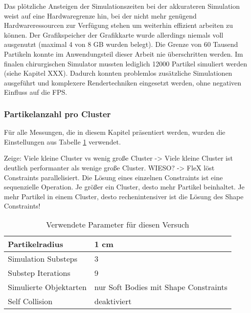 
Das plötzliche Ansteigen der Simulationszeiten bei der akkurateren Simulation weist auf eine Hardwaregrenze hin, bei der nicht mehr genügend Hardwareressourcen zur Verfügung stehen um weiterhin effizient arbeiten zu können. Der Grafikspeicher der Grafikkarte wurde allerdings niemals voll ausgenutzt (maximal 4 von 8 GB wurden belegt). Die Grenze von 60 Tausend Partikeln konnte im Anwendungsteil dieser Arbeit nie überschritten werden. Im finalen chirurgischen Simulator mussten lediglich 12000 Partikel simuliert werden (siehe Kapitel XXX). Dadurch konnten problemlos zusätzliche Simulationen ausgeführt und komplexere Rendertechniken eingesetzt werden, ohne negativen Einfluss auf die FPS.





\subsubsection{Partikelanzahl pro Cluster}
Für alle Messungen, die in diesem Kapitel präsentiert werden, wurden die Einstellungen aus Tabelle \ref{table_soft_assets} verwendet.


Zeige: Viele kleine Cluster vs wenig große Cluster -> Viele kleine Cluster ist deutlich performanter als wenige große Cluster. WIESO? -> FleX löst Constraints parallelisiert. Die Lösung eines einzelnen Constraints ist eine sequenzielle Operation. Je größer ein Cluster, desto mehr Partikel beinhaltet. Je mehr Partikel in einem Cluster, desto rechenintensiver ist die Lösung des Shape Constraints!

\begin{table}[]
\centering
\caption{Verwendete Parameter für diesen Versuch}
\label{table_soft_assets}
\begin{tabular}{l|l}
 \hline
Partikelradius & 1 cm  \\ \hline
Simulation Substeps & 3     \\ \hline
Substep Iterations & 9            \\ \hline
Simulierte Objektarten &  nur Soft Bodies mit Shape Constraints\\ \hline
Self Collision & deaktiviert \\ \hline%
\end{tabular}
\end{table}

